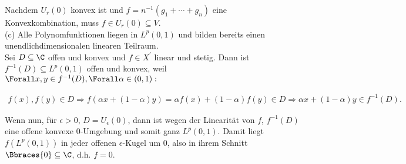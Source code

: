 \begin{solution}
Nachdem $U_r(0)$ konvex ist und $f = n^{-1}(g_1 + \cdots + g_n)$ eine Konvexkombination, muss $f \in U_r(0) \subseteq V$. \\

(c)
Alle Polynomfunktionen liegen in $L^p(0, 1)$ und bilden bereits einen unendlichdimensionalen linearen Teilraum. \\

Sei $D \subseteq \C$ offen und konvex und $f \in X^\prime$ linear und stetig. Dann ist $f^{-1}(D) \subseteq L^p(0, 1)$ offen und konvex, weil $\Forall x, y \in f^{-1}(D), \Forall \alpha \in (0, 1):$

\begin{align*}
  f(x), f(y) \in D
  \Rightarrow
  f(\alpha x + (1 - \alpha) y)
  =
  \alpha f(x) + (1 - \alpha) f(y) \in D
  \Rightarrow
  \alpha x + (1 - \alpha) y \in f^{-1}(D).
\end{align*}

Wenn nun, für $\epsilon > 0$, $D = U_\epsilon(0)$, dann ist wegen der Linearität von $f$, $f^{-1}(D)$ eine offene konvexe $0$-Umgebung und somit ganz $L^p(0, 1)$. Damit liegt $f(L^p(0, 1))$ in jeder offenen $\epsilon$-Kugel um $0$, also in ihrem Schnitt $\Bbraces{0} \subseteq \C$, d.h. $f = 0$.

\end{solution}
